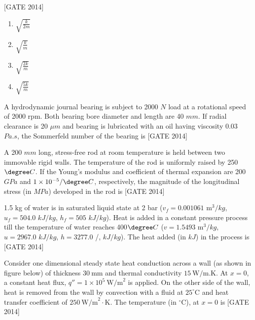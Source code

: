 \hfill{[GATE 2014]}
    \begin{multicols}{4}
    \begin{enumerate}
        \item $\sqrt{\frac{k}{2m}}$
        \item $\sqrt{\frac{k}{m}}$
        \item $\sqrt{\frac{2k}{m}}$
        \item $\sqrt{\frac{5k}{m}}$
    \end{enumerate}
    \end{multicols}
    \item A hydrodynamic journal bearing is subject to 2000 $N$ load at a rotational speed of 2000 rpm. Both bearing bore diameter and length are 40 $mm$. If radial clearance is 20 $\mu m$ and bearing is lubricated with an oil having viscosity 0.03 $Pa.s$, the Sommerfeld number of the bearing is \underline{\hspace{2cm}}\hfill{[GATE 2014]}
   \\
    

    \item A 200 $mm$ long, stress-free rod at room temperature is held between two immovable rigid walls. The temperature of the rod is uniformly raised by 250$\degree C$. If the Young's modulus and coefficient of thermal expansion are 200 $GPa$ and $1 \times 10^{-5}/ \degree C$, respectively, the magnitude of the longitudinal stress (in $MPa$) developed in the rod is \underline{\hspace{2cm}}\hfill{[GATE 2014]}
  \\
  
\item 1.5 kg of water is in saturated liquid state at 2 bar ($v_f = 0.001061$ m$^3 /kg$, $u_f = 504.0$ $kJ/kg$, $h_f = 505$ $kJ/kg$). Heat is added in a constant pressure process till the temperature of water reaches 400$\degree C$ ($v = 1.5493$ m$^3 /kg$, $u = 2967.0$ $kJ/kg$, $h = 3277.0$ /, $kJ/kg$). The heat added (in $kJ$) in the process is \underline{\hspace{2cm}}\hfill{[GATE 2014]}
 \\
    
 \item Consider one dimensional steady state heat conduction across a wall (as shown in figure below) of thickness $30 \ \text{mm}$ and thermal conductivity $15 \ \text{W/m.K}$. At $x = 0$, a constant heat flux, $q'' = 1 \times 10^5 \ \text{W/m}^2$ is applied. On the other side of the wall, heat is removed from the wall by convection with a fluid at $25^\circ \text{C}$ and heat transfer coefficient of $250 \ \text{W/m}^2\cdot\text{K}$. The temperature (in $^\circ \text{C}$), at $x = 0$ is \underline{\hspace{2cm}}\hfill{[GATE 2014]}

